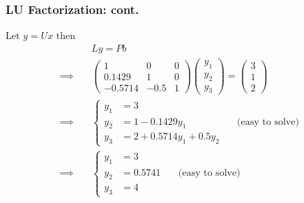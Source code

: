 \documentclass{beamer}
\begin{document}
\begin{frame}\frametitle{LU Factorization: cont.}
	Let $y = Ux$ then 
	\begin{align*}
		&  	Ly = Pb \\
		\implies \quad & 
			\begin{pmatrix}
    			1 & 0 & 0\\
    			0.1429 & 1 & 0\\
    			-0.5714 & -0.5 & 1
    		\end{pmatrix}
			\begin{pmatrix} 
				y_1 \\ y_2 \\ y_3 
			\end{pmatrix}
			= 
			\begin{pmatrix} 
				3 \\ 1 \\ 2 
			\end{pmatrix} \\
		\implies \quad & 
			\left\{
				\begin{array}{llr}
					y_1 &= 3\\
					y_2 &= 1 - 0.1429y_1 
						& \quad \text{(easy to solve)}\\
					y_3 &= 2 + 0.5714y_1 + 0.5y_2
				\end{array} 
			\right. \\
		\implies \quad & 
			\left\{
				\begin{array}{llr}
					y_1 &= 3\\
					y_2 &= 0.5741 
						& \quad \text{(easy to solve)} \\
					y_3 &= 4
				\end{array}
			\right.
	\end{align*}
\end{frame}
\end{document}

